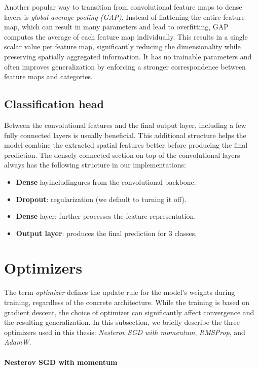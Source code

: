 Another popular way to transition from convolutional feature maps to dense layers is \emph{global average pooling (GAP)}. Instead of flattening the entire feature map, which can result in many parameters and lead to overfitting, GAP computes the average of each feature map individually. This results in a single scalar value per feature map, significantly reducing the dimensionality while preserving spatially aggregated information. It has no trainable parameters and often improves generalization by enforcing a stronger correspondence between feature maps and categories.

\subsection{Classification head}

Between the convolutional features and the final output layer, including a few fully connected layers is usually beneficial. This additional structure helps the model combine the extracted spatial features better before producing the final prediction. The densely connected section on top of the convolutional layers always has the following structure in our implementations:

\begin{itemize}
    \item \textbf{Dense} layincludingures from the convolutional backbone.
    \item \textbf{Dropout}: regularization (we default to turning it off).
    \item \textbf{Dense} layer: further processes the feature representation.
    \item \textbf{Output layer}: produces the final prediction for $3$ classes.
\end{itemize}

\section{Optimizers}

The term \emph{optimizer} defines the update rule for the model's weights during training, regardless of the concrete architecture. While the training is based on gradient descent, the choice of optimizer can significantly affect convergence and the resulting generalization. In this subsection, we briefly describe the three optimizers used in this thesis: \emph{Nesterov SGD with momentum}, \emph{RMSProp}, and \emph{AdamW}.

\paragraph{Nesterov SGD with momentum}


